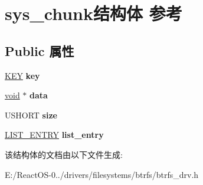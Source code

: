 \hypertarget{structsys__chunk}{}\section{sys\+\_\+chunk结构体 参考}
\label{structsys__chunk}
\subsection*{Public 属性}
\begin{DoxyCompactItemize}
\item 
\mbox{\label{structsys__chunk_af1d7a39fe551843246c5c24dcdc1bbdf}} 
\hyperlink{struct_k_e_y}{K\+EY} {\bfseries key}
\item 
\mbox{\label{structsys__chunk_adaf15ec87fcc4d7a0a91716804caffb6}} 
\hyperlink{interfacevoid}{void} $\ast$ {\bfseries data}
\item 
\mbox{\label{structsys__chunk_aaa573514dc20fba4848ad5039a9c266b}} 
U\+S\+H\+O\+RT {\bfseries size}
\item 
\mbox{\label{structsys__chunk_a3aa6fc9de45db792edf843fd676d76bf}} 
\hyperlink{struct___l_i_s_t___e_n_t_r_y}{L\+I\+S\+T\+\_\+\+E\+N\+T\+RY} {\bfseries list\+\_\+entry}
\end{DoxyCompactItemize}


该结构体的文档由以下文件生成\+:\begin{DoxyCompactItemize}
\item 
E\+:/\+React\+O\+S-\/0../drivers/filesystems/btrfs/btrfs\+\_\+drv.\+h\end{DoxyCompactItemize}
